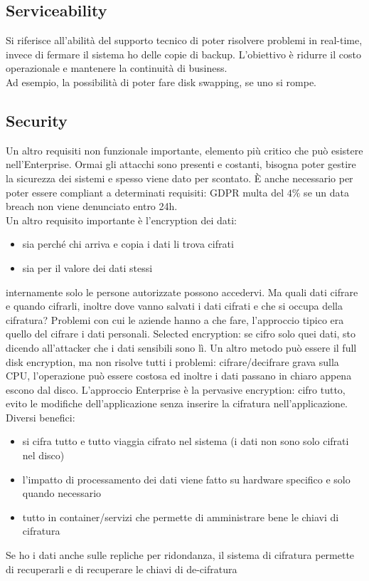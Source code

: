 \documentclass{article}
\begin{document}
\subsection{Serviceability}
Si riferisce all'abilità del supporto tecnico di poter risolvere problemi in real-time, invece di fermare il sistema ho delle copie di backup. L'obiettivo è ridurre il costo operazionale e mantenere la continuità di business.\\ Ad esempio, la possibilità di poter fare disk swapping, se uno si rompe.
\subsection{Security}
Un altro requisiti non funzionale importante, elemento più critico che può esistere nell'Enterprise. Ormai gli attacchi sono presenti e costanti, bisogna poter gestire la sicurezza dei sistemi e spesso viene dato per scontato. È anche necessario per poter essere compliant a determinati requisiti: GDPR multa del $4\%$ se un data breach non viene denunciato entro 24h.\\ Un altro requisito importante è l'encryption dei dati:
\begin{itemize}
\item sia perché chi arriva e copia i dati li trova cifrati
\item sia per il valore dei dati stessi
\end{itemize}
internamente solo le persone autorizzate possono accedervi. Ma quali dati cifrare e quando cifrarli, inoltre dove vanno salvati i dati cifrati e che si occupa della cifratura? Problemi con cui le aziende hanno a che fare, l'approccio tipico era quello del cifrare i dati personali. Selected encryption: se cifro solo quei dati, sto dicendo all'attacker che i dati sensibili sono lì. Un altro metodo può essere il full disk encryption, ma non risolve tutti i problemi: cifrare/decifrare grava sulla CPU, l'operazione può essere costosa ed inoltre i dati passano in chiaro appena escono dal disco. L'approccio Enterprise è la pervasive encryption: cifro tutto, evito le modifiche dell'applicazione senza inserire la cifratura nell'applicazione. Diversi benefici:
\begin{itemize}
\item si cifra tutto e tutto viaggia cifrato nel sistema (i dati non sono solo cifrati nel disco)
\item l'impatto di processamento dei dati viene fatto su hardware specifico e solo quando necessario
\item tutto in container/servizi che permette di amministrare bene le chiavi di cifratura
\end{itemize}
Se ho i dati anche sulle repliche per ridondanza, il sistema di cifratura permette di recuperarli e di recuperare le chiavi di de-cifratura
\end{document}
